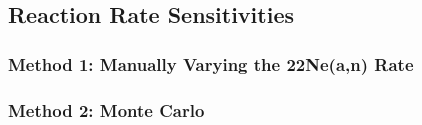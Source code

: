 
\subsection{Reaction Rate Sensitivities}

\subsubsection{Method 1: Manually Varying the 22Ne(a,n) Rate}

\subsubsection{Method 2: Monte Carlo}



